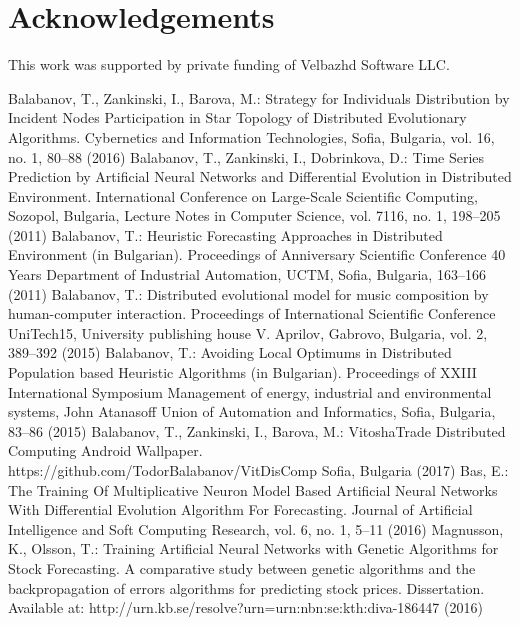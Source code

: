 \documentclass{llncs}
\begin{document}
\section*{Acknowledgements}
%
This work was supported by private funding of Velbazhd Software LLC.
%
%
\begin{thebibliography}{}
%
Balabanov, T., Zankinski, I., Barova, M.:
Strategy for Individuals Distribution by Incident Nodes Participation in Star Topology of Distributed Evolutionary Algorithms.
Cybernetics and Information Technologies, Sofia, Bulgaria, vol. 16, no. 1, 80--88  (2016)
%
Balabanov, T., Zankinski, I., Dobrinkova, D.:
Time Series Prediction by Artificial Neural Networks and Differential Evolution in Distributed Environment.
International Conference on Large-Scale Scientific Computing, Sozopol, Bulgaria, Lecture Notes in Computer Science, vol. 7116, no. 1, 198--205  (2011)
%
Balabanov, T.:
Heuristic Forecasting Approaches in Distributed Environment (in Bulgarian).
Proceedings of Anniversary Scientific Conference 40 Years Department of Industrial Automation, UCTM, Sofia, Bulgaria, 163--166 (2011)
%
Balabanov, T.:
Distributed evolutional model for music composition by human-computer interaction.
Proceedings of International Scientific Conference UniTech15, University publishing house V. Aprilov, Gabrovo, Bulgaria, vol. 2, 389--392 (2015)
%
Balabanov, T.:
Avoiding Local Optimums in Distributed Population based Heuristic Algorithms (in Bulgarian).
Proceedings of XXIII International Symposium Management of energy, industrial and environmental systems, John Atanasoff Union of Automation and Informatics, Sofia, Bulgaria, 83--86 (2015)
%
Balabanov, T., Zankinski, I., Barova, M.:
VitoshaTrade Distributed Computing Android Wallpaper.
https://github.com/TodorBalabanov/VitDisComp Sofia, Bulgaria  (2017)
%
Bas, E.:
The Training Of Multiplicative Neuron Model Based Artificial Neural Networks With Differential Evolution Algorithm For Forecasting.
Journal of Artificial Intelligence and Soft Computing Research, vol. 6, no. 1, 5--11 (2016)
%
Magnusson, K., Olsson, T.:
Training Artificial Neural Networks with Genetic Algorithms for Stock Forecasting.
A comparative study between genetic algorithms and the backpropagation of errors algorithms for predicting stock prices. Dissertation. Available at: http://urn.kb.se/resolve?urn=urn:nbn:se:kth:diva-186447 (2016)
%

\end{thebibliography}
\end{document}

